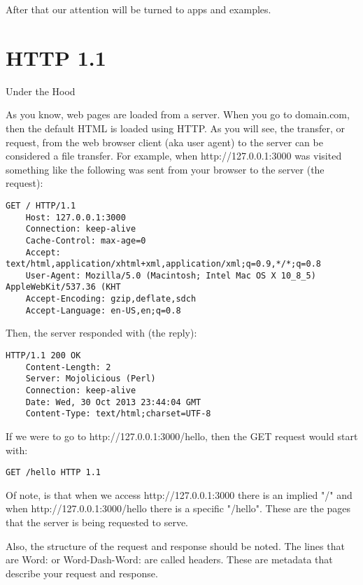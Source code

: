 \documentclass[14pt]{extreport}
\begin{document}
After that our attention will be turned to apps and examples.

\section{HTTP 1.1}

{\Large Under the Hood}

As you know, web pages are loaded from a server. When you go to domain.com,
then the default HTML is loaded using HTTP.  As you will see, the transfer, or
request, from the web browser client (aka user agent) to the server can be
considered a file transfer. For example, when http://127.0.0.1:3000 was visited
something like the following was sent from your browser to the server (the
request):

\begin{lstlisting}[style=BashOutputStyle]
    GET / HTTP/1.1
    Host: 127.0.0.1:3000
    Connection: keep-alive
    Cache-Control: max-age=0
    Accept: text/html,application/xhtml+xml,application/xml;q=0.9,*/*;q=0.8
    User-Agent: Mozilla/5.0 (Macintosh; Intel Mac OS X 10_8_5) AppleWebKit/537.36 (KHT
    Accept-Encoding: gzip,deflate,sdch
    Accept-Language: en-US,en;q=0.8
\end{lstlisting}

Then, the server responded with (the reply):

\begin{lstlisting}[style=BashOutputStyle]
    HTTP/1.1 200 OK
    Content-Length: 2
    Server: Mojolicious (Perl)
    Connection: keep-alive
    Date: Wed, 30 Oct 2013 23:44:04 GMT
    Content-Type: text/html;charset=UTF-8
\end{lstlisting}

If we were to go to http://127.0.0.1:3000/hello, then the GET request would
start with:

\begin{lstlisting}[style=BlockStyle]
    GET /hello HTTP 1.1
\end{lstlisting}

Of note, is that when we access http://127.0.0.1:3000 there is an implied "/"
and when http://127.0.0.1:3000/hello there is a specific "/hello".  These are
the pages that the server is being requested to serve.

Also, the structure of the request and response should be noted.  The lines
that are Word: or Word-Dash-Word: are called headers.  These are metadata that
describe your request and response.
\end{document}
